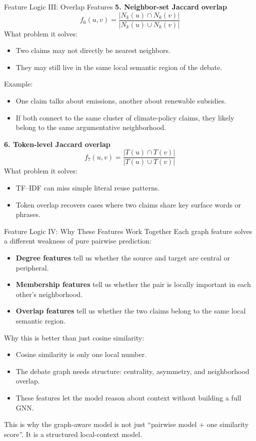 \documentclass[aspectratio=169]{beamer}
\begin{document}
\begin{frame}[shrink=8]{Feature Logic III: Overlap Features}
\small
\textbf{5. Neighbor-set Jaccard overlap}
\[
f_6(u,v)=\frac{|N_k(u)\cap N_k(v)|}{|N_k(u)\cup N_k(v)|}
\]
What problem it solves:
\begin{itemize}
  \item Two claims may not directly be nearest neighbors.
  \item They may still live in the same local semantic region of the debate.
\end{itemize}

Example:
\begin{itemize}
  \item One claim talks about emissions, another about renewable subsidies.
  \item If both connect to the same cluster of climate-policy claims, they likely belong to the same argumentative neighborhood.
\end{itemize}

\textbf{6. Token-level Jaccard overlap}
\[
f_7(u,v)=\frac{|T(u)\cap T(v)|}{|T(u)\cup T(v)|}
\]
What problem it solves:
\begin{itemize}
  \item TF--IDF can miss simple literal reuse patterns.
  \item Token overlap recovers cases where two claims share key surface words or phrases.
\end{itemize}
\normalsize
\end{frame}

\begin{frame}[shrink=5]{Feature Logic IV: Why These Features Work Together}
\small
Each graph feature solves a different weakness of pure pairwise prediction:
\begin{itemize}
  \item \textbf{Degree features} tell us whether the source and target are central or peripheral.
  \item \textbf{Membership features} tell us whether the pair is locally important in each other's neighborhood.
  \item \textbf{Overlap features} tell us whether the two claims belong to the same local semantic region.
\end{itemize}

Why this is better than just cosine similarity:
\begin{itemize}
  \item Cosine similarity is only one local number.
  \item The debate graph needs structure: centrality, asymmetry, and neighborhood overlap.
  \item These features let the model reason about context without building a full GNN.
\end{itemize}

This is why the graph-aware model is not just ``pairwise model + one similarity score''. It is a structured local-context model.
\normalsize
\end{frame}
\end{document}
